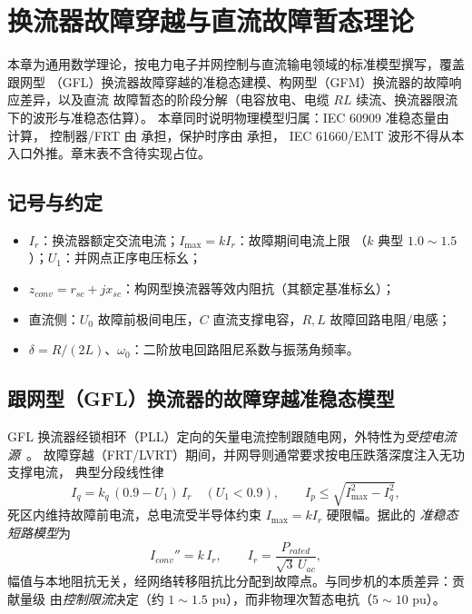 
\section{换流器故障穿越与直流故障暂态理论}\label{sec:sc-theory-convdc}

\begin{theorynote}
本章为通用数学理论，按电力电子并网控制与直流输电领域的标准模型撰写，覆盖跟网型
（GFL）换流器故障穿越的准稳态建模、构网型（GFM）换流器的故障响应差异，以及直流
故障暂态的阶段分解（电容放电、电缆 $RL$ 续流、换流器限流下的波形与准稳态估算）。
本章同时说明物理模型归属：IEC 60909 准稳态量由  计算，
控制器/FRT 由  承担，保护时序由  承担，
IEC 61660/EMT 波形不得从本入口外推。章末表不含待实现占位。
\end{theorynote}

\subsection{记号与约定}
\begin{itemize}
  \item $I_r$：换流器额定交流电流；$I_{\max}=kI_r$：故障期间电流上限
        （$k$ 典型 $1.0\sim1.5$）；$U_1$：并网点正序电压标幺；
  \item $z_{conv}=r_{sc}+jx_{sc}$：构网型换流器等效内阻抗（其额定基准标幺）；
  \item 直流侧：$U_0$ 故障前极间电压，$C$ 直流支撑电容，$R,L$ 故障回路电阻/电感；
  \item $\delta=R/(2L)$、$\omega_0$：二阶放电回路阻尼系数与振荡角频率。
\end{itemize}

\subsection{跟网型（GFL）换流器的故障穿越准稳态模型}
GFL 换流器经锁相环（PLL）定向的矢量电流控制跟随电网，外特性为\emph{受控电流源}~\cite{conv:yazdani,conv:rocabert}。
故障穿越（FRT/LVRT）期间，并网导则通常要求按电压跌落深度注入无功支撑电流，
典型分段线性律
\begin{equation}
I_q=k_q\,(0.9-U_1)\,I_r\quad(U_1<0.9),\qquad
I_p\le\sqrt{I_{\max}^2-I_q^2},
\end{equation}
死区内维持故障前电流，总电流受半导体约束 $I_{\max}=kI_r$ 硬限幅。据此的
\emph{准稳态短路模型}为
\begin{equation}
I_{conv}''=k\,I_r,\qquad I_r=\frac{P_{rated}}{\sqrt3\,U_{ac}},
\end{equation}
幅值与本地阻抗无关，经网络转移阻抗比分配到故障点。与同步机的本质差异：贡献量级
由\emph{控制限流}决定（约 $1\sim1.5$ pu），而非物理次暂态电抗（$5\sim10$ pu）。

